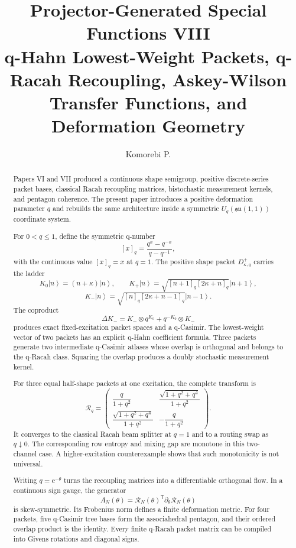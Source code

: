 \documentclass[11pt,openany]{report}
\title{\textbf{Projector-Generated Special Functions VIII}\\[0.25em]
\Large q-Hahn Lowest-Weight Packets, q-Racah Recoupling, Askey-Wilson Transfer Functions, and Deformation Geometry}
\author{Komorebi P.}
\date{}
\theoremstyle{definition}
\theoremstyle{remark}
\newcommand{\e}{\mathrm e}
\newcommand{\Rcal}{\mathcal R}
\newcommand{\ket}[1]{\left|#1\right\rangle}
\newcommand{\qnum}[1]{\left[#1\right]_q}
\begin{document}
\hypersetup{pageanchor=false}
\maketitle

\begin{abstract}
Papers VI and VII produced a continuous shape semigroup, positive discrete-series packet bases, classical Racah recoupling matrices, bistochastic measurement kernels, and pentagon coherence. The present paper introduces a positive deformation parameter $q$ and rebuilds the same architecture inside a symmetric $U_q(\mathfrak{su}(1,1))$ coordinate system.

For $0<q\le1$, define the symmetric q-number
\[
\qnum{x}=\frac{q^x-q^{-x}}{q-q^{-1}},
\]
with the continuous value $\qnum{x}=x$ at $q=1$. The positive shape packet $D^+_{\kappa,q}$ carries the ladder
\[
K_0\ket n=(n+\kappa)\ket n,
\qquad
K_+\ket n=\sqrt{\qnum{n+1}\qnum{2\kappa+n}}\ket{n+1},
\]
\[
K_-\ket n=\sqrt{\qnum n\qnum{2\kappa+n-1}}\ket{n-1}.
\]
The coproduct
\[
\Delta K_-=K_-\otimes q^{K_0}+q^{-K_0}\otimes K_-
\]
produces exact fixed-excitation packet spaces and a q-Casimir. The lowest-weight vector of two packets has an explicit q-Hahn coefficient formula. Three packets generate two intermediate q-Casimir atlases whose overlap is orthogonal and belongs to the q-Racah class. Squaring the overlap produces a doubly stochastic measurement kernel.

For three equal half-shape packets at one excitation, the complete transform is
\[
\boxed{
\Rcal_q=
\begin{pmatrix}
\dfrac{q}{1+q^2}&\dfrac{\sqrt{1+q^2+q^4}}{1+q^2}\\[0.8em]
\dfrac{\sqrt{1+q^2+q^4}}{1+q^2}&-\dfrac{q}{1+q^2}
\end{pmatrix}.
}
\]
It converges to the classical Racah beam splitter at $q=1$ and to a routing swap as $q\downarrow0$. The corresponding row entropy and mixing gap are monotone in this two-channel case. A higher-excitation counterexample shows that such monotonicity is not universal.

Writing $q=\e^{-\theta}$ turns the recoupling matrices into a differentiable orthogonal flow. In a continuous sign gauge, the generator
\[
A_N(\theta)=\Rcal_N(\theta)^{\mathsf T}\partial_\theta\Rcal_N(\theta)
\]
is skew-symmetric. Its Frobenius norm defines a finite deformation metric. For four packets, five q-Casimir tree bases form the associahedral pentagon, and their ordered overlap product is the identity. Every finite q-Racah packet matrix can be compiled into Givens rotations and diagonal signs.


\end{abstract}
\end{document}
